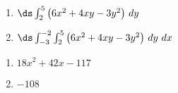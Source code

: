 {\begin{enumerate}
	\item $\ds \int_2^{5} \big(6x^2+4xy-3y^2\big)\ dy$\\
	\item $\ds \int_{-3}^{-2} \int_2^{5} \big(6x^2+4xy-3y^2\big)\ dy\ dx$
\end{enumerate}
}
{\begin{enumerate}
	\item $18x^2+42x-117$
	\item	$-108$
\end{enumerate}
}
